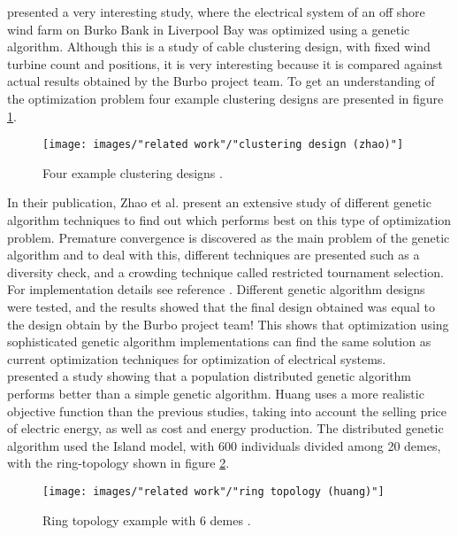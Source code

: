 \noindent \cite{Zhao} presented a very interesting study, where the electrical system of an off shore wind farm on Burko Bank in Liverpool Bay was optimized using a genetic algorithm. Although this is a study of cable clustering design, with fixed wind turbine count and positions, it is very interesting because it is compared against actual results obtained by the Burbo project team. To get an understanding of the optimization problem four example clustering designs are presented in figure \ref{Clustering Design}.\\


\begin{figure}[h!]
\begin{center}
\texttt{[image: images/"related work"/"clustering design (zhao)"]}
\caption{Four example clustering designs \citep{Zhao}.}
\label{Clustering Design}
\end{center}
\end{figure}


\noindent In their publication, Zhao et al. present an extensive study of different genetic algorithm techniques to find out which performs best on this type of optimization problem. Premature convergence is discovered as the main problem of the genetic algorithm and to deal with this, different techniques are presented such as a diversity check, and a crowding technique called restricted tournament selection. For implementation details see reference \citep{Zhao}. Different genetic algorithm designs were tested, and the results showed that the final design obtained was equal to the design obtain by the Burbo project team! This shows that optimization using sophisticated genetic algorithm implementations can find the same solution as current optimization techniques for optimization of electrical systems.\\


\noindent \cite{Huang} presented a study showing that a population distributed genetic algorithm performs better than a simple genetic algorithm. Huang uses a more realistic objective function than the previous studies, taking into account the selling price of electric energy, as well as cost and energy production. The distributed genetic algorithm used the Island model, with 600 individuals divided among 20 demes, with the ring-topology shown in figure \ref{Ring Topology}.\\

\begin{figure}[h!]
\begin{center}
\texttt{[image: images/"related work"/"ring topology (huang)"]}
\caption{Ring topology example with 6 demes \citep{Huang}.}
\label{Ring Topology}
\end{center}
\end{figure}


